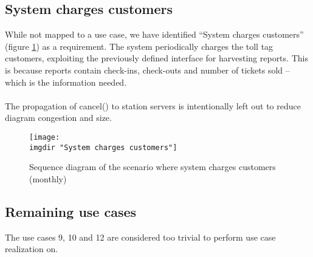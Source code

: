 \subsection{System charges customers}
While not mapped to a use case, we have identified ``System charges customers'' (figure \ref{fig:seq_diag:system_charges_customers}) as a requirement. The system periodically charges the toll tag customers, exploiting the previously defined interface for harvesting reports. This is because reports contain check-ins, check-outs and number of tickets sold -- which is the information needed.\\\\
The propagation of cancel() to station servers is intentionally left out to reduce diagram congestion and size.
\begin{figure}
  \texttt{[image: \\imgdir "System charges customers"]}
  \caption{Sequence diagram of the scenario where system charges customers (monthly)}
  \label{fig:seq_diag:system_charges_customers}
\end{figure}

\subsection{Remaining use cases}
The use cases 9, 10 and 12 are considered too trivial to perform use case realization on.
